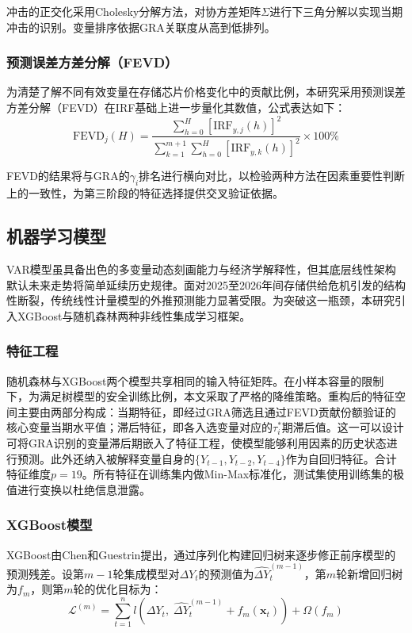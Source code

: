 \documentclass[a4paper,12pt,fontset=fandol]{ctexart}
\begin{document}
冲击的正交化采用Cholesky分解方法，对协方差矩阵$\Sigma$进行下三角分解以实现当期冲击的识别。变量排序依据GRA关联度从高到低排列。

\subsubsection{预测误差方差分解（FEVD）}

为清楚了解不同有效变量在存储芯片价格变化中的贡献比例，本研究采用预测误差方差分解（FEVD）在IRF基础上进一步量化其数值，公式表达如下：
\begin{equation}
\text{FEVD}_j(H) = \frac{\sum_{h=0}^{H}[\text{IRF}_{y,j}(h)]^2}{\sum_{k=1}^{m+1}\sum_{h=0}^{H}[\text{IRF}_{y,k}(h)]^2}\times 100\%
\end{equation}

FEVD的结果将与GRA的$\gamma_i$排名进行横向对比，以检验两种方法在因素重要性判断上的一致性，为第三阶段的特征选择提供交叉验证依据。

\subsection{机器学习模型}
VAR模型虽具备出色的多变量动态刻画能力与经济学解释性，但其底层线性架构默认未来走势将简单延续历史规律。面对2025至2026年间存储供给危机引发的结构性断裂，传统线性计量模型的外推预测能力显著受限。为突破这一瓶颈，本研究引入XGBoost与随机森林两种非线性集成学习框架。

\subsubsection{特征工程}

随机森林与XGBoost两个模型共享相同的输入特征矩阵。在小样本容量的限制下，为满足树模型的安全训练比例，本文采取了严格的降维策略。重构后的特征空间主要由两部分构成：当期特征，即经过GRA筛选且通过FEVD贡献份额验证的核心变量当期水平值；滞后特征，即各入选变量对应的$\tau_i^*$期滞后值。这一可以设计可将GRA识别的变量滞后期嵌入了特征工程，使模型能够利用因素的历史状态进行预测。此外还纳入被解释变量自身的$\{Y_{t-1},Y_{t-2},Y_{t-4}\}$作为自回归特征。合计特征维度$p=19$。所有特征在训练集内做Min-Max标准化，测试集使用训练集的极值进行变换以杜绝信息泄露。

\subsubsection{XGBoost模型}

XGBoost由Chen和Guestrin\cite{chen2016xgb}提出，通过序列化构建回归树来逐步修正前序模型的预测残差。设第$m-1$轮集成模型对$\Delta Y_t$的预测值为$\widehat{\Delta Y}_t^{(m-1)}$，第$m$轮新增回归树为$f_m$，则第$m$轮的优化目标为：
\begin{equation}
\mathcal{L}^{(m)} = \sum_{t=1}^{n}l\!\left(\Delta Y_t,\;\widehat{\Delta Y}_t^{(m-1)}+f_m(\mathbf{x}_t)\right)+\Omega(f_m)
\end{equation}
\end{document}
